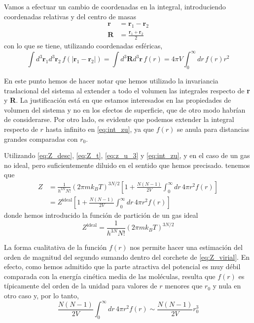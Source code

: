 Vamos a efectuar un cambio de coordenadas en la integral, introduciendo coordenadas relativas y del centro de masas
\begin{align}
	\mathbf{r} &= \mathbf{r}_1 - \mathbf{r}_2 \nonumber \\
	\mathbf{R} &= \frac{\mathbf{r}_1 + \mathbf{r}_2}{2}
\end{align}
con lo que se tiene, utilizando coordenadas esféricas,
\begin{equation}\label{eq:int_zu}
	\int d^3\mathbf{r}_1 d^3\mathbf{r}_2 \, f(|\mathbf{r}_1 - \mathbf{r}_2|) = \int d^3\mathbf{R} d^3\mathbf{r} \, f(r) = 4\pi V \int_0^{\infty} dr \, f(r) r^2
\end{equation}

En este punto hemos de hacer notar que hemos utilizado la invariancia traslacional del sistema al extender a todo el volumen las integrales respecto de \textbf{r} y \textbf{R}.
La justificación está en que estamos interesados en las propiedades de volumen del sistema y no en los efectos de superficie, que de otro modo habrían de considerarse.
Por otro lado, es evidente que podemos extender la integral respecto de $r$ hasta infinito en \eqref{eq:int_zu}, ya que $f (r)$ se anula para distancias grandes comparadas con $r_0$.

Utilizando \eqref{eq:Z_desc}, \eqref{eq:Z_t}, \eqref{eq:z_u_3} y \eqref{eq:int_zu}, y en el caso de un gas no ideal, pero suficientemente diluido en el sentido que hemos precisado. tenemos que
\begin{align}\label{eq:Z_virial}
	Z &= \frac{1}{h^{3N} N!} (2\pi m k_B T)^{3N/2} \left[ 1 + \frac{N(N-1)}{2V} \int_0^{\infty} dr \, 4 \pi r^2 f(r) \right] \nonumber \\
	  &= Z^\text{ideal} \left[ 1 + \frac{N(N-1)}{2V} \int_0^{\infty} dr \, 4 \pi r^2 f(r) \right]
\end{align}
donde hemos introducido la función de partición de un gas ideal
\begin{equation}
	Z^\text{ideal} = \frac{1}{h^{3N} N!} (2\pi m k_B T)^{3N/2}
\end{equation}

La forma cualitativa de la función $f(r)$ nos permite hacer una estimación del orden de magnitud del segundo sumando dentro del corchete de \eqref{eq:Z_virial}.
En efecto, como hemos admitido que la parte atractiva del potencial es muy débil comparada con la energía cinética media de las moléculas, resulta que $f(r)$ es típicamente del orden de la unidad para valores de $r$ menores que $r_0$ y nula en otro caso y, por lo tanto,
\begin{equation}
	\frac{N(N-1)}{2V} \int_0^{\infty} dr \, 4 \pi r^2 f(r) \sim \frac{N(N-1)}{2V} r_0^3
\end{equation}

